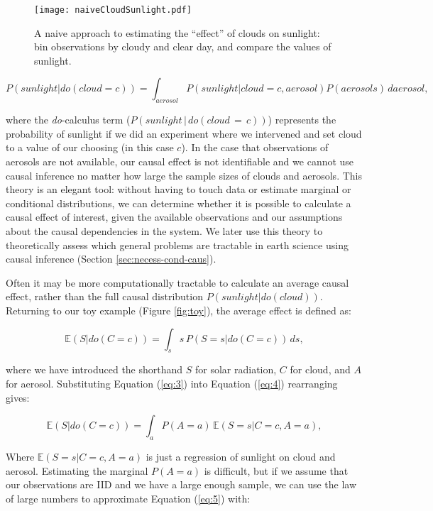 \documentclass[12pt]{article}
\begin{document}
\begin{figure}
  \texttt{[image: naiveCloudSunlight.pdf]}
  \caption{A naive approach to estimating the ``effect'' of clouds on
    sunlight: bin observations by cloudy and clear day, and compare
    the values of sunlight.}
  \label{fig:naive-cloud-sunlight}
\end{figure}

\begin{equation}
  P(sunlight | do(cloud = c)) = \int_{aerosol} P(sunlight| cloud = c,
  aerosol) P(aerosols) \, d aerosol,
  \label{eq:3}
\end{equation}

where the \textit{do}-calculus \citep{pearl2009} term
($P(sunlight \, | \, do(cloud\, = \,c))$) represents the probability of
sunlight if we did an experiment where we intervened and set cloud to
a value of our choosing (in this case $c$). In the case that
observations of aerosols are not available, our causal effect is not
identifiable and we cannot use causal inference no matter how large
the sample sizes of clouds and aerosols. This theory is an elegant
tool: without having to touch data or estimate marginal or conditional
distributions, we can determine whether it is possible to calculate a
causal effect of interest, given the available observations and our
assumptions about the causal dependencies in the system. We later use
this theory to theoretically assess which general problems are
tractable in earth science using causal inference (Section
\ref{sec:necess-cond-caus}).

Often it may be more computationally tractable to calculate an average
causal effect, rather than the full causal distribution
$P(sunlight | do(cloud))$. Returning to our toy example (Figure
\ref{fig:toy}), the average effect is defined as:

\begin{equation}
  \mathbb{E}(S | do(C = c)) = \int_{s} s \, P(S = s
  | do(C=c)) \, ds,
  \label{eq:4}
\end{equation}

where we have introduced the shorthand $S$ for solar radiation, $C$
for cloud, and $A$ for aerosol. Substituting Equation (\ref{eq:3})
into Equation (\ref{eq:4}) rearranging gives:

\begin{equation}
  \mathbb{E}(S | do(C = c))  = \int_{a} P(A=a) \, \mathbb{E}(S=s |
  C=c, A=a),
  \label{eq:5}
\end{equation}

Where $\mathbb{E}(S=s | C=c, A=a)$ is just a regression of sunlight on
cloud and aerosol. Estimating the marginal $P(A=a)$ is difficult, but
if we assume that our observations are IID and we have a large enough
sample, we can use the law of large numbers to approximate Equation
(\ref{eq:5}) with:
\end{document}
